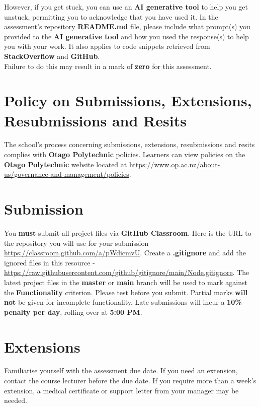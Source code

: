 \documentclass{article}
\begin{document}
 However, if you get stuck, you can use an \textbf{AI generative tool} to help you get unstuck, permitting you to acknowledge that you have used it. In the assessment's repository \textbf{README.md} file, please include what prompt(s) you provided to the \textbf{AI generative tool} and how you used the response(s) to help you with your work. It also applies to code snippets retrieved from \textbf{StackOverflow} and \textbf{GitHub}. \\
 
 Failure to do this may result in a mark of \textbf{zero} for this assessment.

\section*{Policy on Submissions, Extensions, Resubmissions and Resits}
The school's process concerning submissions, extensions, resubmissions and resits complies with \textbf{Otago Polytechnic} policies. Learners can view policies on the \textbf{Otago Polytechnic} website located at \href{https://www.op.ac.nz/about-us/governance-and-management/policies}{https://www.op.ac.nz/about-us/governance-and-management/policies}.

\section*{Submission}
You \textbf{must} submit all project files via \textbf{GitHub Classroom}. Here is the URL to the repository you will use for your submission – \href{https://classroom.github.com/a/pWdicmvU}{https://classroom.github.com/a/pWdicmvU}.  Create a \textbf{.gitignore} and add the ignored files in this resource - \href{https://raw.githubusercontent.com/github/gitignore/main/Node.gitignore}{https://raw.githubusercontent.com/github/gitignore/main/Node.gitignore}. The latest project files in the \textbf{master} or \textbf{main} branch will be used to mark against the \textbf{Functionality} criterion. Please test before you submit. Partial marks \textbf{will not} be given for incomplete functionality. Late submissions will incur a \textbf{10\% penalty per day}, rolling over at \textbf{5:00 PM}.

\section*{Extensions}
Familiarise yourself with the assessment due date. If you need an extension, contact the course lecturer before the due date. If you require more than a week's extension, a medical certificate or support letter from your manager may be needed.
\end{document}
